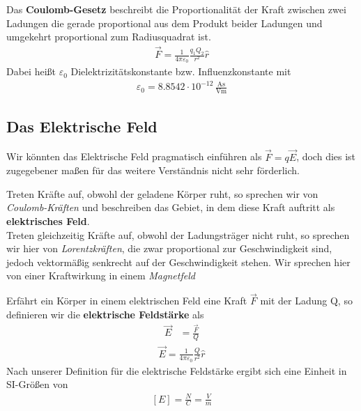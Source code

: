 Das \textbf{Coulomb-Gesetz} beschreibt die Proportionalität der Kraft zwischen zwei Ladungen die gerade proportional aus dem Produkt beider Ladungen und umgekehrt proportional zum Radiusquadrat ist.
\begin{align} \label{eqn:Coulomb-Gesetz}
\boxed{ \vec{F} = \frac{1}{4\pi \varepsilon_{0}} \frac{q_1 Q_2}{r^2} \hat{r}}
\end{align}Dabei heißt $\varepsilon_{0}$ Dielektrizitätskonstante bzw. Influenzkonstante mit\begin{align*}
\varepsilon_{0} = 8.8542 \cdot 10^{-12} \,\mathrm{ \frac{As}{Vm}}
\end{align*}
\subsection{Das Elektrische Feld}Wir könnten das Elektrische Feld pragmatisch einführen als $\vec{F} = q\vec{E}$, doch dies ist zugegebener maßen für das weitere Verständnis nicht sehr förderlich. \par
Treten Kräfte auf, obwohl der geladene Körper ruht, so sprechen wir von \textit{Coulomb-Kräften} und beschreiben das Gebiet, in dem diese Kraft auftritt als \textbf{elektrisches Feld}. \\Treten gleichzeitig Kräfte auf, obwohl der Ladungsträger nicht ruht, so sprechen wir hier von \textit{Lorentzkräften}, die zwar proportional zur Geschwindigkeit sind, jedoch vektormäßig senkrecht auf der Geschwindigkeit stehen. Wir sprechen hier von einer Kraftwirkung in einem \textit{Magnetfeld} \par
Erfährt ein Körper in einem elektrischen Feld eine Kraft $\vec{F}$ mit der Ladung Q, so definieren wir die \textbf{elektrische Feldstärke} als \begin{align}
\vec{E} &= \frac{\vec{F}}{Q} 
\end{align}\begin{align} \label{eqn:elFeldstärke}
		\boxed{\vec{E}= \frac{1}{4\pi \varepsilon_{0}} \frac{Q}{r^2} \hat{r}}
\end{align} Nach unserer Definition für die elektrische Feldstärke ergibt sich eine Einheit in SI-Größen von \begin{align}\left[ E\right] = \frac{N}{C} = \frac{V}{m}
\end{align}
